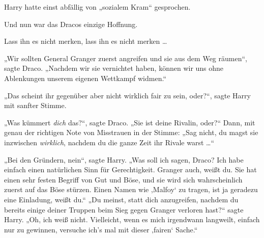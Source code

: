 Harry hatte einst abfällig von „sozialem Kram“ gesprochen.

Und nun war das Dracos einzige Hoffnung.

Lass ihn es nicht merken, lass ihn es nicht merken …

„Wir sollten General Granger zuerst angreifen und sie aus dem Weg räumen“, sagte Draco.
„Nachdem wir sie vernichtet haben, können wir uns ohne Ablenkungen unserem eigenen Wettkampf widmen.“

„Das scheint ihr gegenüber aber nicht wirklich fair zu sein, oder?“, sagte Harry mit sanfter Stimme.

„Was kümmert \emph{dich} das?“, sagte Draco.
„Sie ist deine Rivalin, oder?“ Dann, mit genau der richtigen Note von Misstrauen in der Stimme:
„Sag nicht, du magst sie inzwischen \emph{wirklich}, nachdem du die ganze Zeit ihr Rivale warst …“

„Bei den Gründern, nein“, sagte Harry.
„Was soll ich sagen, Draco? Ich habe einfach einen natürlichen Sinn für Gerechtigkeit. Granger auch, weißt du. Sie hat einen sehr festen Begriff von Gut und Böse, und sie wird sich wahrscheinlich zuerst auf das Böse stürzen. Einen Namen wie ‚Malfoy‘ zu tragen, ist ja geradezu eine Einladung, weißt du.“
„Du meinst, statt dich anzugreifen, nachdem du bereits einige deiner Truppen beim Sieg gegen Granger verloren hast?“ sagte Harry.
„Oh, ich weiß nicht. Vielleicht, wenn es mich irgendwann langweilt, einfach nur zu gewinnen, versuche ich’s mal mit dieser ‚fairen‘ Sache.“

